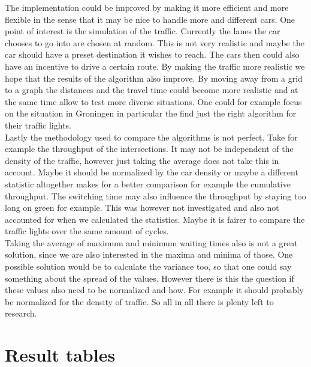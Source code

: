 \documentclass[a4paper,11pt]{article}
\begin{document}
\noindent The implementation could be improved by making it more efficient and more flexible in the sense that it may be nice to handle more and different cars.
One point of interest is the simulation of the traffic.
Currently the lanes the car chooses to go into are chosen at random.
This is not very realistic and maybe the car should have a preset destination it wishes to reach.
The cars then could also have an incentive to drive a certain route.
By making the traffic more realistic we hope that the results of the algorithm also improve.
By moving away from a grid to a graph the distances and the travel time could become more realistic and at the same time allow to test more diverse situations.
One could for example focus on the situation in Groningen in particular the find just the right algorithm for their traffic lights.\\

\noindent Lastly the methodology used to compare the algorithms is not perfect.
Take for example the throughput of the intersections.
It may not be independent of the density of the traffic, however just taking the average does not take this in account.
Maybe it should be normalized by the car density or maybe a different statistic altogether makes for a better comparison for example the cumulative throughput.
The switching time may also influence the throughput by staying too long on green for example.
This was however not investigated and also not accounted for when we calculated the statistics.
Maybe it is fairer to compare the traffic lights over the same amount of cycles.\\

\noindent Taking the average of maximum and minimum waiting times also is not a great solution, since we are also interested in the maxima and minima of those.
One possible solution would be to calculate the variance too, so that one could say something about the spread of the values.
However there is this the question if these values also need to be normalized and how.
For example it should probably be normalized for the density of traffic.
So all in all there is plenty left to research.





\appendix
\section{Result tables}\label{app:rtables}
\end{document}
